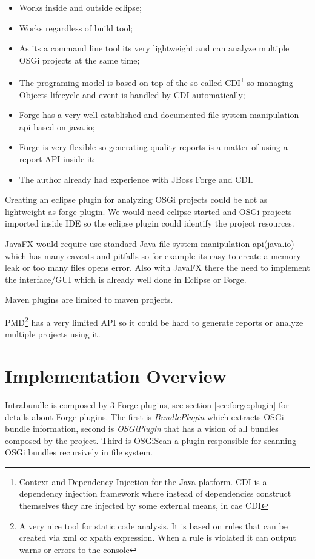 \begin{itemize}
\item Works inside and outside eclipse;
\item Works regardless of build tool;
\item As its a command line tool its very lightweight and can analyze multiple OSGi projects at the same time;
\item The programing model is based on top of the so called CDI\footnote{Context and Dependency Injection for the Java platform. CDI is a dependency injection framework where instead of dependencies construct themselves they are injected by some external means, in cae CDI} so managing Objects lifecycle and event is handled by CDI automatically;
\item Forge has a very well established and documented file system manipulation api based on java.io;
\item Forge is very flexible so generating quality reports is a matter of using a report API inside it;  
\item The author already had experience with JBoss Forge and CDI. 
\end{itemize}

Creating an eclipse plugin for analyzing OSGi projects could be not as lightweight as forge plugin. We would need eclipse started and OSGi projects imported inside IDE so the eclipse plugin could identify the project resources.

JavaFX would require use standard Java file system manipulation api(java.io) which has many caveats and pitfalls so for example its easy to create a memory leak or too many files opens error. Also with JavaFX there the need to implement the interface/GUI which is already well done in Eclipse or Forge.

Maven plugins are limited to maven projects.

PMD\footnote{A very nice tool for static code analysis. It is based on rules that can be created via xml or xpath expression. When a rule is violated it can output warns or errors to the console} has a very limited API so it could be hard to generate reports or analyze multiple projects using it. 


\section{Implementation Overview}

Intrabundle is composed by 3 Forge plugins, see section \ref{sec:forge:plugin} for details about Forge plugins. The first is \emph{BundlePlugin} which extracts OSGi bundle information, second is \emph{OSGiPlugin} that has a vision of all bundles composed by the project. Third is OSGiScan a plugin responsible for scanning OSGi bundles recursively in file system. 



